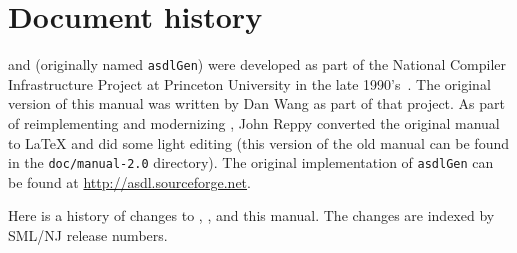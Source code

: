 %
\chapter{Document history}
\label{ch:history}

\asdl{} and \asdlgen{} (originally named \texttt{asdlGen}) were developed as part
of the National Compiler Infrastructure Project at Princeton University in the
late 1990's~\cite{usenix:zephyr-asdl}.
The original version of this manual was written by Dan Wang as part of that project.
As part of reimplementing and modernizing \asdl{}, John Reppy converted the original
manual to \LaTeX{} and did some light editing (this version of the old manual
can be found in the \texttt{doc/manual-2.0} directory).
The original implementation of \texttt{asdlGen} can be
found at \url{http://asdl.sourceforge.net}.

Here is a history of changes to \asdl{}, \asdlgen{}, and this manual.
The changes are indexed by SML/NJ release numbers.

